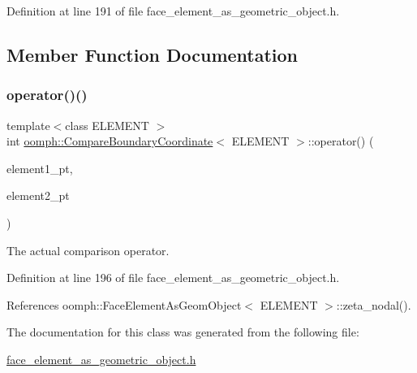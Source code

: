 Definition at line 191 of file face\+\_\+element\+\_\+as\+\_\+geometric\+\_\+object.\+h.



\subsection{Member Function Documentation}
\mbox{\label{classoomph_1_1CompareBoundaryCoordinate_a352523d5f49b9d36ce94701a82926f11}} 
\subsubsection{\texorpdfstring{operator()()}{operator()()}}
{\footnotesize\ttfamily template$<$class E\+L\+E\+M\+E\+NT $>$ \\
int \hyperlink{classoomph_1_1CompareBoundaryCoordinate}{oomph\+::\+Compare\+Boundary\+Coordinate}$<$ E\+L\+E\+M\+E\+NT $>$\+::operator() (\begin{DoxyParamCaption}\item[{\hyperlink{classoomph_1_1GeneralisedElement}{Generalised\+Element} $\ast$const \&}]{element1\+\_\+pt,  }\item[{\hyperlink{classoomph_1_1GeneralisedElement}{Generalised\+Element} $\ast$const \&}]{element2\+\_\+pt }\end{DoxyParamCaption})\hspace{0.3cm}{\ttfamily [inline]}}



The actual comparison operator. 



Definition at line 196 of file face\+\_\+element\+\_\+as\+\_\+geometric\+\_\+object.\+h.



References oomph\+::\+Face\+Element\+As\+Geom\+Object$<$ E\+L\+E\+M\+E\+N\+T $>$\+::zeta\+\_\+nodal().



The documentation for this class was generated from the following file\+:\begin{DoxyCompactItemize}
\item 
\hyperlink{face__element__as__geometric__object_8h}{face\+\_\+element\+\_\+as\+\_\+geometric\+\_\+object.\+h}\end{DoxyCompactItemize}
